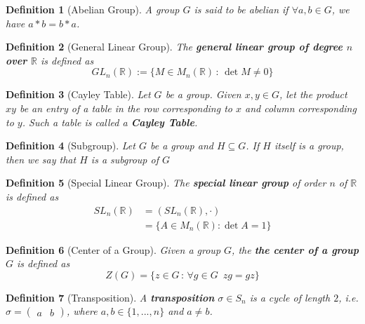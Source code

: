 \documentclass[9pt,landscape,a4paper]{article}
\newcommand{\hlnoteb}[1]{\textcolor{base16-eighties-magenta}{\textbf{#1}}}
\theoremstyle{empty}
\newtheorem{defn}{Definition}
\begin{document}
\begin{multicols*}{5}
\begin{defn}[Abelian Group]\label{defn:abelian_group}
  A group $G$ is said to be abelian if $\forall a, b \in G$, we have $a * b = b * a$.
\end{defn}

\begin{defn}[General Linear Group]
\label{defn:general_linear_group}
  The \hlnoteb{general linear group of degree $n$ over $\mathbb{R}$} is defined as
  \begin{equation*}
    GL_n(\mathbb{R}) := \{ M \in M_n(\mathbb{R}) \, : \, \det M \neq 0 \}
  \end{equation*}
\end{defn}

\begin{defn}[Cayley Table]\label{defn:cayley_table}
  Let $G$ be a group. Given $x, y \in G$, let the product $xy$ be an entry of a table in the row corresponding to $x$ and column corresponding to $y$. Such a table is called a \hlnoteb{Cayley Table}.
\end{defn}

\begin{defn}[Subgroup]\label{defn:subgroup}
  Let $G$ be a group and $H \subseteq G$. If $H$ itself is a group, then we say that $H$ is a subgroup of $G$
\end{defn}

\begin{defn}[Special Linear Group]\label{defn:special_linear_group}
  The \hlnoteb{special linear group} of order $n$ of $\mathbb{R}$ is defined as
  \begin{align*}
    SL_n(\mathbb{R}) &= (SL_n(\mathbb{R}), \cdot) \\
                     &= \{A \in M_n(\mathbb{R}) : \det A = 1 \}
  \end{align*}
\end{defn}

\begin{defn}[Center of a Group]\label{defn:center_of_a_group}
  Given a group $G$, the \hlnoteb{the center of a group $G$} is defined as
  \begin{equation*}
    Z(G) = \{z \in G \, : \, \forall g \in G \enspace zg = gz \}
  \end{equation*}
\end{defn}

\begin{defn}[Transposition]\label{defn:transposition}
  A \hlnoteb{transposition} $\sigma \in S_n$ is a cycle of length $2$, i.e. $\sigma = \begin{pmatrix} a & b \end{pmatrix}$, where $a, b \in \{1, ..., n\}$ and $a \neq b$.
\end{defn}


\end{multicols*}
\end{document}
